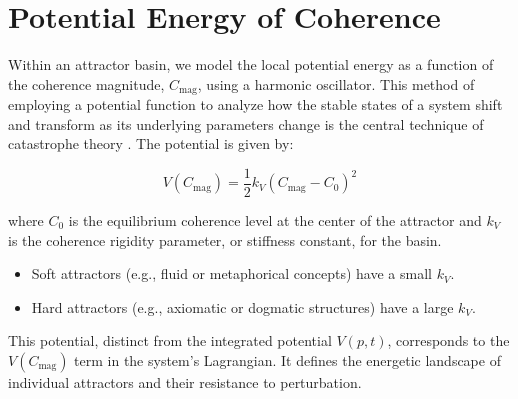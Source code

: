 \section{Potential Energy of Coherence}
\label{5.5:potential_energy_of_coherence}

Within an attractor basin, we model the local potential energy as a function of the coherence magnitude, \(C_{\text{mag}}\), using a harmonic oscillator. This method of employing a potential function to analyze how the stable states of a system shift and transform as its underlying parameters change is the central technique of catastrophe theory \autocite{Thom1975}. The potential is given by:

\begin{equation}\label{eq:attractor_potential}
V(C_{\text{mag}}) = \frac{1}{2}k_V(C_{\text{mag}} - C_0)^2
\end{equation}

where \(C_0\) is the equilibrium coherence level at the center of the attractor and \(k_V\) is the coherence rigidity parameter, or stiffness constant, for the basin.

\begin{itemize}

    \item Soft attractors (e.g., fluid or metaphorical concepts) have a small \(k_V\).
    
    \item Hard attractors (e.g., axiomatic or dogmatic structures) have a large \(k_V\).

\end{itemize}

This potential, distinct from the integrated potential \(V(p,t)\), corresponds to the \(V(C_{\text{mag}})\) term in the system's Lagrangian. It defines the energetic landscape of individual attractors and their resistance to perturbation. 